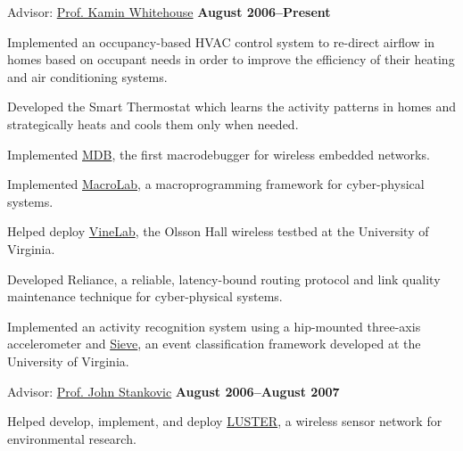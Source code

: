 \documentclass[letterpaper]{article}
\newenvironment{outerlist}[1][\enskip\textbullet]%
        {\begin{enumerate}[#1]}{\end{enumerate}%
         \vspace{-.6\baselineskip}}
\newenvironment{innerlist}[1][\enskip\textbullet]%
        {\begin{compactenum}[#1]}{\end{compactenum}}
\begin{document}
\begin{outerlist}
\item[] Advisor:
      \href{http://www.cs.virginia.edu/~whitehouse}
           {Prof. Kamin Whitehouse}
      \hfill \textbf{August 2006--Present}
        \begin{innerlist}
        \item Implemented an occupancy-based HVAC control system to re-direct
          airflow in homes based on occupant needs in order to improve the
          efficiency of their heating and air conditioning systems.
        \item Developed the Smart Thermostat which learns the activity patterns
          in homes and strategically heats and cools them only when needed.
        \item Implemented
          \href{http://www.cs.virginia.edu/~whitehouse/research/mdb/}{MDB},
          the first macrodebugger for wireless embedded networks.
        \item Implemented \href{http://www.cs.virginia.edu/~whitehouse/research/macrolab/}{MacroLab}, a macroprogramming framework for
          cyber-physical systems.
        \item Helped deploy
          \href{http://www.cs.virginia.edu/~whitehouse/research/testbed/}{VineLab},
          the Olsson Hall wireless testbed at the University of Virginia.
        \item Developed Reliance, a reliable, latency-bound routing
          protocol and link quality
          maintenance technique for cyber-physical systems.
        \item Implemented an activity recognition system using a hip-mounted
          three-axis accelerometer and
          \href{http://www.cs.virginia.edu/~whitehouse/research/sieve/}{Sieve}, an
          event classification framework developed at the University of Virginia.
        \end{innerlist}

\item[] Advisor: \href{http://www.cs.virginia.edu/brochure/profs/stankovic.html}
           {Prof. John Stankovic}
      \hfill \textbf{August 2006--August 2007}
        \begin{innerlist}
        \item Helped develop, implement, and deploy \href{http://www.cs.virginia.edu/wsn/luster/}{LUSTER}, a wireless
          sensor network for environmental research. 
        \end{innerlist}
\end{outerlist}
\end{document}
